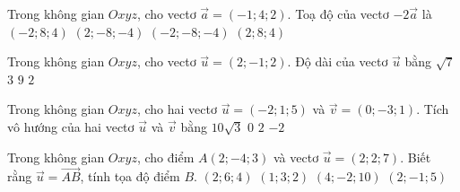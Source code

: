 \begin{ex}%
Trong không gian $Oxyz$, cho vectơ $\overrightarrow{a}=(-1;4;2)$. Toạ độ của vectơ $-2\overrightarrow{a}$ là
\choice
{$(-2;8;4)$}
{\True $(2;-8;-4)$}
{$(-2;-8;-4)$}
{$(2;8;4)$}
\end{ex}

\begin{ex}%
Trong không gian $Oxyz$, cho vectơ $\overrightarrow{u}=(2;-1;2)$. Độ dài của vectơ $\overrightarrow{u}$ bằng
\choice
{$\sqrt{7}$}
{\True $3$}
{$9$}
{$2$}
\end{ex}

\begin{ex}%
Trong không gian $Oxyz$, cho hai vectơ $\overrightarrow{u}=(-2;1;5)$ và $\overrightarrow{v}=(0;-3;1)$. Tích vô hướng của hai vectơ $\overrightarrow{u}$ và $\overrightarrow{v}$ bằng
\choice
{$10\sqrt{3}$}
{$0$}
{\True $2$}
{$-2$}
\end{ex}

\begin{ex}%
Trong không gian $Oxyz$, cho điểm $A(2;-4;3)$ và vectơ $\overrightarrow{u}=(2;2;7)$. Biết rằng $\overrightarrow{u}=\overrightarrow{AB}$, tính tọa độ điểm $B$.
\choice
{$(2;6;4)$}
{$(1;3;2)$}
{\True $(4;-2;10)$}
{$(2;-1;5)$}
\end{ex}

